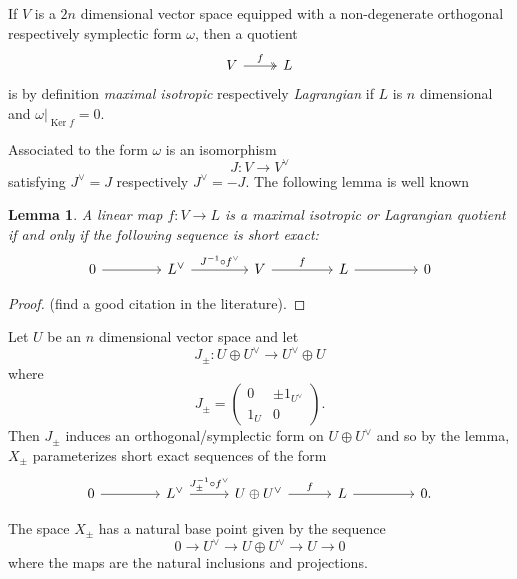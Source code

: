 \documentclass{amsart}
\newtheorem{lemma}[theorem]{Lemma}
\theoremstyle{definition}
\newcommand{\Ker}{\operatorname{Ker}}
\newcommand{\Xpm}{X_{\pm}}
\begin{document}
If $V$ is a $2n$ dimensional vector space equipped with a
non-degenerate orthogonal respectively symplectic form $\omega$, then a
quotient
\[
\begin{tikzcd}
V \arrow[r,  two heads, "f"] & L
\end{tikzcd}
\]
is by definition \emph{maximal isotropic} respectively \emph{Lagrangian} if $L$ is
$n$ dimensional and $\omega |_{\Ker f} = 0$. 

Associated to the form $\omega$ is an isomorphism
\[
J : V\to V^{\vee } 
\]
satisfying $J^{\vee} = J$ respectively $J^{\vee}=-J$. The following
lemma is well known
\begin{lemma}\label{lem: lagrangian quotient condition as a ses}
A linear map $f:V\to L$ is a maximal isotropic or Lagrangian quotient if
and only if the following sequence is short exact:
\[
\begin{tikzcd}[column sep={6em,between origins}]
0 \arrow[r] &
L^{\vee } \arrow[r, "J^{-1}\circ f^{\vee}"] &
V \arrow[r, "f"] &
L \arrow[r] &
0
\end{tikzcd}
\]
\end{lemma}
\begin{proof}
 \cite[]{} {\color{red}(find a good citation in the literature)}.
\end{proof}


Let $U$ be an $n$ dimensional vector space and let 
\[
J_{\pm}: U\oplus U^{\vee} \to U^{\vee}\oplus U
\]
where 
\[
J_{\pm} = \begin{pmatrix}
        0 & \pm 1_{U^{\vee }}\\
        1_{U} & 0
      \end{pmatrix}.
\]
Then $J_{\pm}$ induces an orthogonal/symplectic form on $U\oplus
U^{\vee}$ and so by the lemma, $\Xpm$ parameterizes short exact
sequences of the form
\[
\begin{tikzcd}[column sep={6em,between origins}]
0 \arrow[r] &
L^{\vee } \arrow[r, "J_{\pm }^{-1}\circ f^{\vee}"] &
U\oplus U^{\vee } \arrow[r, "f"] &
L \arrow[r] &
0.
\end{tikzcd}
\]

The space $\Xpm$ has a natural base point given by the sequence
\[
0\to U^{\vee}\to U\oplus U^{\vee} \to U\to 0
\]
where the maps are the natural inclusions and projections.
\end{document}
